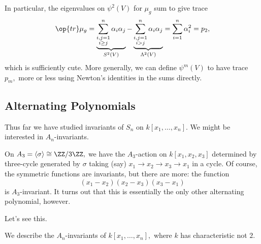 In particular, the eigenvalues on $\psi^2(V)$ for $\mu_g$ sum to give trace
\[\op{tr}\mu_g=\underbrace{\sum_{\substack{i,j=1\\i\ge j}}^n\alpha_i\alpha_j}_{S^2(V)}-\underbrace{\sum_{\substack{i,j=1\\i>j}}^n\alpha_i\alpha_j}_{\Lambda^2(V)}=\sum_{i=1}^n\alpha_i^2=p_2,\]
which is sufficiently cute. More generally, we can define $\psi^m(V)$ to have trace $p_m,$ more or less using Newton's identities in the sums directly.

\subsection{Alternating Polynomials}
Thus far we have studied invariants of $S_n$ on $k[x_1,\ldots,x_n].$ We might be interested in $A_n$-invariants.
\begin{example}
	On $A_3=\langle\sigma\rangle\cong\ZZ/3\ZZ,$ we have the $A_3$-action on $k[x_1,x_2,x_3]$ determined by three-cycle generated by $\sigma$ taking (say) $x_1\to x_2\to x_3\to x_1$ in a cycle. Of course, the symmetric functions are invariants, but there are more: the function
	\[(x_1-x_2)(x_2-x_3)(x_3-x_1)\]
	is $A_3$-invariant. It turns out that this is essentially the only other alternating polynomial, however.
\end{example}
Let's see this.
\begin{exercise}
	We describe the $A_n$-invariants of $k[x_1,\ldots,x_n],$ where $k$ has characteristic not $2.$
\end{exercise}
